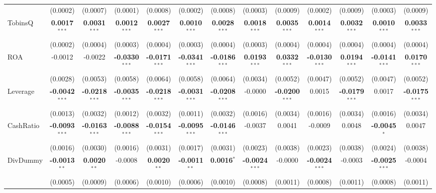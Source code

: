 \begin{landscape}
\begin{table}[H]
\begin{tabular}{lcccccccccccc}
 & (0.0002) & (0.0007) & (0.0001) & (0.0008) & (0.0002) & (0.0008) & (0.0003) & (0.0009) & (0.0002) & (0.0009) & (0.0003) & (0.0009) \\
TobinsQ & \textbf{0.0017}$^{***}$ & \textbf{0.0031}$^{***}$ & \textbf{0.0012}$^{***}$ & \textbf{0.0027}$^{***}$ & \textbf{0.0010}$^{***}$ & \textbf{0.0028}$^{***}$ & \textbf{0.0018}$^{***}$ & \textbf{0.0035}$^{***}$ & \textbf{0.0014}$^{***}$ & \textbf{0.0032}$^{***}$ & \textbf{0.0010}$^{***}$ & \textbf{0.0033}$^{***}$ \\
 & (0.0002) & (0.0004) & (0.0003) & (0.0004) & (0.0003) & (0.0004) & (0.0003) & (0.0004) & (0.0004) & (0.0004) & (0.0004) & (0.0004) \\
ROA & -0.0012 & -0.0022 & \textbf{-0.0330}$^{***}$ & \textbf{-0.0171}$^{***}$ & \textbf{-0.0341}$^{***}$ & \textbf{-0.0186}$^{***}$ & \textbf{0.0193}$^{***}$ & \textbf{0.0332}$^{***}$ & \textbf{-0.0130}$^{***}$ & \textbf{0.0194}$^{***}$ & \textbf{-0.0141}$^{***}$ & \textbf{0.0170}$^{***}$ \\
 & (0.0028) & (0.0053) & (0.0058) & (0.0064) & (0.0058) & (0.0064) & (0.0034) & (0.0052) & (0.0047) & (0.0052) & (0.0047) & (0.0052) \\
Leverage & \textbf{-0.0042}$^{***}$ & \textbf{-0.0218}$^{***}$ & \textbf{-0.0035}$^{***}$ & \textbf{-0.0218}$^{***}$ & \textbf{-0.0031}$^{***}$ & \textbf{-0.0208}$^{***}$ & -0.0000 & \textbf{-0.0200}$^{***}$ & 0.0015 & \textbf{-0.0179}$^{***}$ & 0.0017 & \textbf{-0.0175}$^{***}$ \\
 & (0.0013) & (0.0032) & (0.0012) & (0.0032) & (0.0011) & (0.0032) & (0.0016) & (0.0034) & (0.0016) & (0.0034) & (0.0016) & (0.0034) \\
CashRatio & \textbf{-0.0093}$^{***}$ & \textbf{-0.0163}$^{***}$ & \textbf{-0.0088}$^{***}$ & \textbf{-0.0154}$^{***}$ & \textbf{-0.0095}$^{***}$ & \textbf{-0.0146}$^{***}$ & -0.0037 & 0.0041 & -0.0009 & 0.0048 & \textbf{-0.0045}$^{*}$ & 0.0047 \\
 & (0.0016) & (0.0030) & (0.0016) & (0.0031) & (0.0017) & (0.0031) & (0.0023) & (0.0038) & (0.0023) & (0.0038) & (0.0024) & (0.0038) \\
DivDummy & \textbf{-0.0013}$^{**}$ & \textbf{0.0020}$^{**}$ & -0.0008 & \textbf{0.0020}$^{**}$ & \textbf{-0.0011}$^{**}$ & \textbf{0.0016}$^{*}$ & \textbf{-0.0024}$^{***}$ & -0.0000 & \textbf{-0.0024}$^{***}$ & -0.0003 & \textbf{-0.0025}$^{***}$ & -0.0004 \\
 & (0.0005) & (0.0009) & (0.0006) & (0.0010) & (0.0006) & (0.0010) & (0.0008) & (0.0011) & (0.0008) & (0.0011) & (0.0008) & (0.0011) \\

\end{tabular}
\end{table}
\end{landscape}
